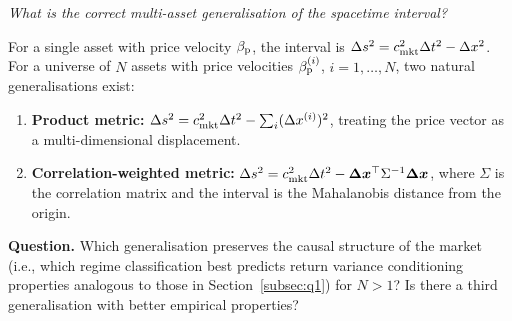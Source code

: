 \begin{openquestion}
\label{oq:multi_asset}
\emph{What is the correct multi-asset generalisation of the spacetime interval?}

For a single asset with price velocity $\beta_{\mathrm{p}}$, the interval is
$\Delta s^2 = c_{\mathrm{mkt}}^2\Delta t^2 - \Delta x^2$.  For a universe of $N$
assets with price velocities $\beta_{\mathrm{p}}^{(i)}$, $i = 1, \ldots, N$, two
natural generalisations exist:

\begin{enumerate}
  \item \textbf{Product metric:} $\Delta s^2 = c_{\mathrm{mkt}}^2\Delta t^2 -
        \sum_i (\Delta x^{(i)})^2$, treating the price vector as a
        multi-dimensional displacement.

  \item \textbf{Correlation-weighted metric:} $\Delta s^2 = c_{\mathrm{mkt}}^2\Delta t^2 -
        \boldsymbol{\Delta x}^\top \Sigma^{-1} \boldsymbol{\Delta x}$,
        where $\Sigma$ is the correlation matrix and the interval is the
        Mahalanobis distance from the origin.
\end{enumerate}

\textbf{Question.} Which generalisation preserves the causal structure of the
market (i.e., which regime classification best predicts return variance
conditioning properties analogous to those in Section~\ref{subsec:q1}) for
$N > 1$?  Is there a third generalisation with better empirical properties?
\end{openquestion}

